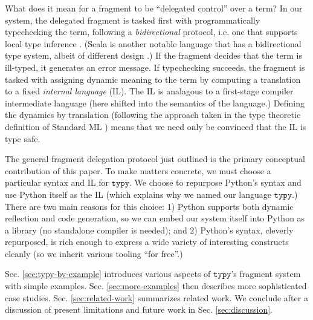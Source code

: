 \documentclass[preprint,10pt]{sigplanconf}
\newcommand{\typy}{\texttt{typy}}
\begin{document}
What does it mean for a fragment to be ``delegated control'' over a term? In our system, the delegated fragment is tasked first with programmatically typechecking the term, following a \emph{bidirectional} protocol, i.e. one that supports local type inference \cite{Pierce:2000:LTI:345099.345100}. (Scala is another notable language that has a bidirectional type system, albeit of different design \cite{OdeZenZen01}.) If the fragment decides that the term is ill-typed, it generates an error message. If typechecking succeeds, the fragment is tasked with assigning dynamic meaning to the term by computing a translation to a fixed \emph{internal language} (IL). The IL is analagous to a first-stage compiler intermediate language (here shifted into the semantics of the language.) Defining the dynamics by translation (following the approach taken in the type theoretic definition of Standard ML \cite{Harper00atype-theoretic}) means that we need only be convinced that the IL is type safe. 

The general fragment delegation protocol just outlined is the primary conceptual contribution of this paper. To make matters concrete, we must choose a particular syntax and IL for $\typy$. We choose to repurpose Python's syntax and use Python itself as the IL (which explains why we named our language $\typy$.)  
There are two main reasons for this choice: 1) Python supports both  dynamic reflection and code generation, so we can embed our system itself into Python as a library (no standalone compiler is needed); and 2) Python's syntax, cleverly repurposed, is rich enough to express a wide variety of interesting constructs cleanly (so we inherit various tooling ``for free''.)

Sec. \ref{sec:typy-by-example} introduces various aspects of $\typy$'s fragment system with simple examples. Sec. \ref{sec:more-examples} then describes more sophisticated case studies. %
Sec. \ref{sec:related-work} summarizes related work. We conclude after a discussion of present limitations and future work in Sec. \ref{sec:discussion}.
\end{document}
